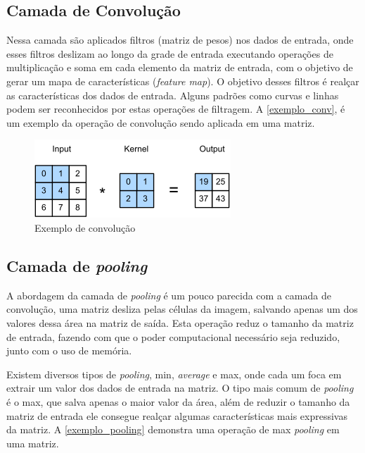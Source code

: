 \subsection{Camada de Convolução}\label{cap_conceitos_cnn_conv}
Nessa camada são aplicados filtros (matriz de pesos) nos dados de entrada, onde esses filtros deslizam ao longo da
grade de entrada executando operações de multiplicação e soma em cada elemento da matriz de entrada, com o objetivo de
gerar um mapa de características (\textit{feature map}).
O objetivo desses filtros é realçar as características dos dados de entrada. Alguns padrões como curvas e linhas podem ser
reconhecidos por estas operações de filtragem.
A \autoref{exemplo_conv}, é um exemplo da operação de convolução sendo aplicada em uma matriz.

\begin{figure}[htb]
	\caption {\label{exemplo_conv} Exemplo de convolução}
	\begin{center}
		\includegraphics[scale=1.0]{Imagens/conv}
	\end{center}
\end{figure}

\subsection{Camada de \textit{pooling}}\label{cap_conceitos_cnn_pooling}
A abordagem da camada de \textit{pooling} é um pouco parecida com a camada de convolução,
uma matriz desliza pelas células da imagem, salvando apenas um dos valores dessa área na matriz de saída.
Esta operação reduz o tamanho da matriz de entrada, fazendo com que o poder computacional necessário seja reduzido,
junto com o uso de memória.

Existem diversos tipos de \textit{pooling}, min, \textit{average} e max, onde cada um foca em extrair um valor dos
dados de entrada na matriz. O tipo mais comum de \textit{pooling} é o max, que salva apenas o maior valor da área,
além de reduzir o tamanho da matriz de entrada ele consegue realçar algumas características mais expressivas da matriz.
A \autoref{exemplo_pooling} demonstra uma operação de max \textit{pooling} em uma matriz.

